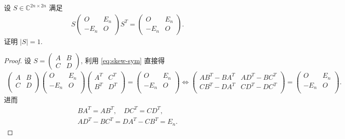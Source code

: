 \documentclass[../../main.tex]{subfiles}%
\begin{document}
\begin{proposition}[辛矩阵行列式]\label{proposition:辛矩阵行列式}
设 \( S \in \mathbb{C}^{2n \times 2n} \) 满足
\begin{align}
S \begin{pmatrix} O & E_n \\ -E_n & O \end{pmatrix} S^T = \begin{pmatrix} O & E_n \\ -E_n & O \end{pmatrix}. \label{eq:skew-sym}
\end{align}
证明 \( |S| = 1 \).
\end{proposition}
\begin{proof}
设 \( S = \begin{pmatrix} A & B \\ C & D \end{pmatrix} \), 利用 \eqref{eq:skew-sym} 直接得
\begin{align*}
\left( \begin{matrix}
	A&		B\\
	C&		D\\
\end{matrix} \right) \left( \begin{matrix}
	O&		E_n\\
	-E_n&		O\\
\end{matrix} \right) \left( \begin{matrix}
	A^T&		C^T\\
	B^T&		D^T\\
\end{matrix} \right) =\left( \begin{matrix}
	O&		E_n\\
	-E_n&		O\\
\end{matrix} \right) \Longleftrightarrow \left( \begin{matrix}
	AB^T-BA^T&		AD^T-BC^T\\
	CB^T-DA^T&		CD^T-DC^T\\
\end{matrix} \right) =\left( \begin{matrix}
	O&		E_n\\
	-E_n&		O\\
\end{matrix} \right) .
\end{align*}
进而
\begin{gather}
BA^T=AB^T,\quad DC^T=CD^T,\label{eq::JHFIOUWJIOJIOWIO--239u2}
\\
AD^T-BC^T=DA^T-CB^T=E_n.\label{eq::JHFIOUWJIOJIOWIO--239u2-1}
\end{gather}


\end{proof}
\end{document}
